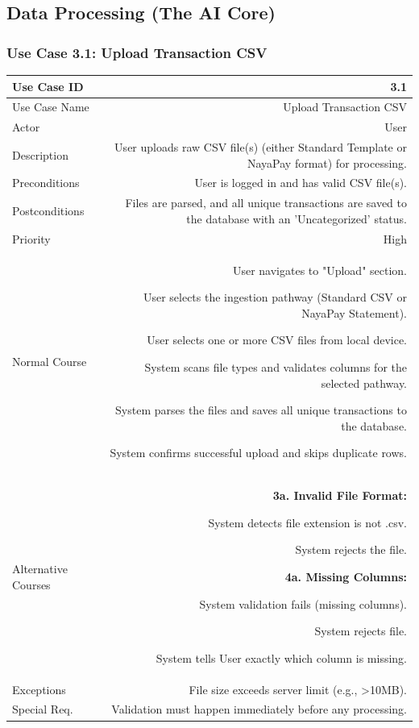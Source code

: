 \newpage

\subsection{Data Processing (The AI Core)}

\subsubsection{Use Case 3.1: Upload Transaction CSV}
\begin{tabularx}{\textwidth}{|L|R|}
	\hline
	Use Case ID & 3.1 \\ \hline
	Use Case Name & Upload Transaction CSV \\ \hline
	Actor & User \\ \hline
	Description & User uploads raw CSV file(s) (either Standard Template or NayaPay format) for processing. \\ \hline
	Preconditions & User is logged in and has valid CSV file(s). \\ \hline
	Postconditions & Files are parsed, and all unique transactions are saved to the database with an 'Uncategorized' status. \\ \hline
	Priority & High \\ \hline
	Normal Course & 
	\begin{normalsteps}
		\item User navigates to "Upload" section.
		\item User selects the ingestion pathway (Standard CSV or NayaPay Statement).
		\item User selects one or more CSV files from local device.
		\item System scans file types and validates columns for the selected pathway.
		\item System parses the files and saves all unique transactions to the database.
		\item System confirms successful upload and skips duplicate rows.
	\end{normalsteps} \\ \hline
	Alternative Courses & 
	\textbf{3a. Invalid File Format:} 
	\begin{altsteps}
		\item System detects file extension is not .csv.
		\item System rejects the file.
	\end{altsteps}
	\textbf{4a. Missing Columns:} 
	\begin{altsteps}
		\item System validation fails (missing columns).
		\item System rejects file.
		\item System tells User exactly which column is missing.
	\end{altsteps} \\ \hline
	Exceptions & File size exceeds server limit (e.g., >10MB). \\ \hline
	Special Req. & Validation must happen immediately before any processing. \\ \hline
\end{tabularx}

